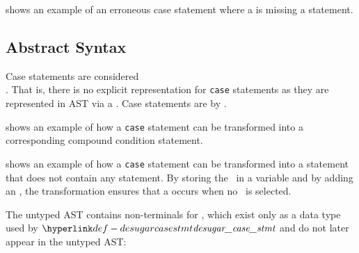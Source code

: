  shows an example of an erroneous case statement
where a \casealternativeterm{} is missing a statement.

\subsection{Abstract Syntax}

Case statements are considered \\ \syntacticsugar{}.
That is, there is no explicit representation for \texttt{case} statements
as they are represented in AST via a \conditionalstatementterm.
Case statements are \desugared{} by .

 shows an example of how a \texttt{case} statement can be transformed into a corresponding
compound condition statement.

 shows an example of how a \texttt{case} statement can be transformed into
a statement that does not contain any  statement.
By storing the \casediscriminantterm\ in a variable and by adding
an \unreachablestatementterm{}, the transformation ensures that a \dynamicerrorterm{} occurs when no
\casealternativeterm\ is selected.

The untyped AST contains non-terminals for \casealternativesterm, which exist
only as a data type used by $\desugarcasestmt$ and do not later appear in the untyped
AST:


